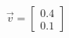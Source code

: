 \documentclass[preview]{standalone}
\begin{document}
\begin{align*}
\vec{v}=\begin{bmatrix}0.4\\0.1\end{bmatrix}
\end{align*}
\end{document}
